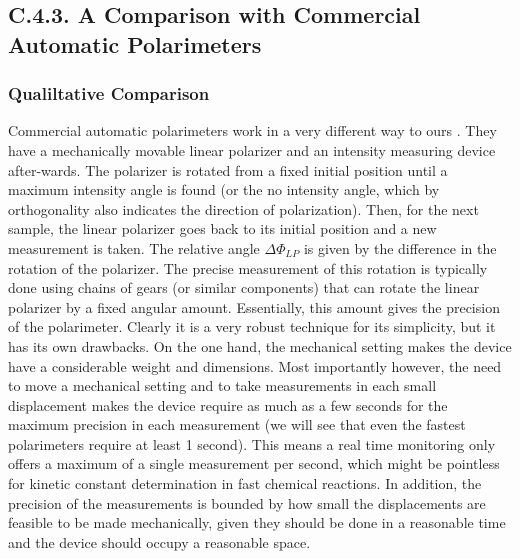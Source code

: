 \documentclass[11pt, a4paper, twoside]{article} %
\begin{document}
\subsection*{C.4.3. A Comparison with Commercial Automatic Polarimeters }

\subsubsection*{Qualiltative Comparison \vspace{-0.1cm}}
Commercial automatic polarimeters work in a very different way to ours \cite{polarimeters}. They have a mechanically movable linear polarizer and an intensity measuring device after-wards. The polarizer is rotated from a fixed initial position until a maximum intensity angle is found (or the no intensity angle, which by orthogonality also indicates the direction of polarization). Then, for the next sample, the linear polarizer goes back to its initial position and a new measurement is taken. The relative angle $\Delta \Phi_{LP}$ is given by the difference in the rotation of the polarizer. The precise measurement of this rotation is typically done using chains of gears (or similar components) that can rotate the linear polarizer by a fixed angular amount. Essentially, this amount gives the precision of the polarimeter. Clearly it is a very robust technique for its simplicity, but it has its own drawbacks. On the one hand, the mechanical setting makes the device have a considerable weight and dimensions. Most importantly however, the need to move a mechanical setting and to take measurements in each small displacement makes the device require as much as a few seconds for the maximum precision in each measurement (we will see that even the fastest polarimeters require at least 1 second). This means a real time monitoring only offers a maximum of a single measurement per second, which might be pointless for kinetic constant determination in fast chemical reactions. In addition, the precision of the measurements is bounded by how small the displacements are feasible to be made mechanically, given they should be done in a reasonable time and the device should occupy a reasonable space. 
\end{document}
